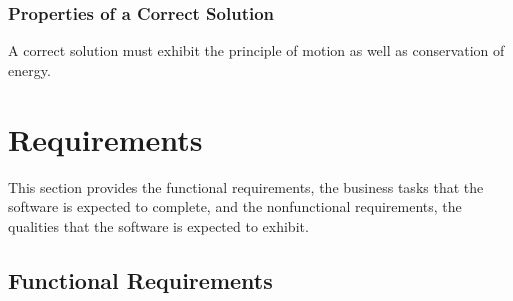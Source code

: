 \documentclass[12pt]{article}
\begin{document}
	\subsubsection{Properties of a Correct Solution} \label{sec_CorrectSolution}
	
	\noindent
	A correct solution must exhibit the principle of motion as well as conservation of energy.
	
	\section{Requirements}
	
	This section provides the functional requirements, the business tasks that the
	software is expected to complete, and the nonfunctional requirements, the
	qualities that the software is expected to exhibit.
	
	\subsection{Functional Requirements}
	
\end{document}
